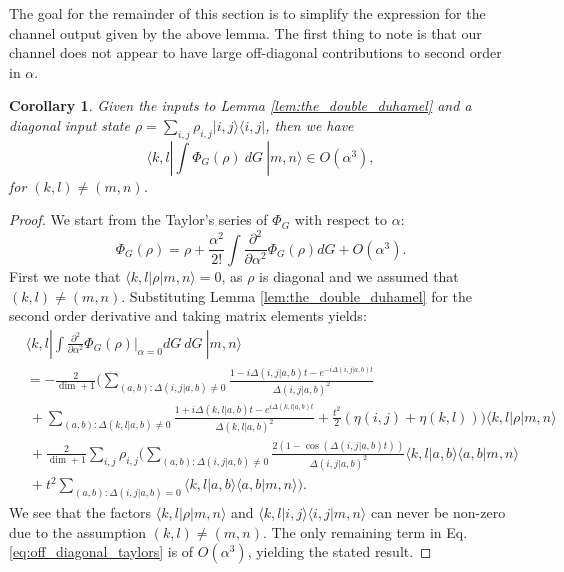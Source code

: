 \documentclass{article}
\newtheorem{corollary}[theorem]{Corollary}
\newcommand{\ket}[1]{|#1\rangle}
\newcommand{\bra}[1]{\langle #1|}
\newcommand{\braket}[2]{\langle #1|#2\rangle}
\newcommand{\ketbra}[2]{| #1\rangle\! \langle #2|}
\newcommand{\bigo}[1]{O\left( #1 \right)}
\begin{document}
The goal for the remainder of this section is to simplify the expression for the channel output given by the above lemma. The first thing to note is that our channel does not appear to have large off-diagonal contributions to second order in $\alpha$. 
\begin{corollary}
    Given the inputs to Lemma \ref{lem:the_double_duhamel} and a diagonal input state $\rho = \sum_{i,j} \rho_{i,j} \ketbra{i,j}{i,j}$, then we have $$\bra{k,l}  \int \Phi_G(\rho) ~dG~ \ket{m,n} \in \bigo{\alpha^3},$$ for $(k,l) \neq (m,n)$.
\end{corollary}
\begin{proof}
    We start from the Taylor's series of $\Phi_G$ with respect to $\alpha$:
    \begin{equation}
        \Phi_G(\rho) = \rho + \frac{\alpha^2}{2!} \int \frac{\partial^2}{\partial \alpha^2} \Phi_G(\rho) dG + \bigo{\alpha^3}. \label{eq:off_diagonal_taylors}
    \end{equation}
    First we note that $\bra{k,l}\rho \ket{m,n} =0$, as $\rho$ is diagonal and we assumed that $(k,l) \neq (m,n)$. Substituting Lemma \ref{lem:the_double_duhamel} for the second order derivative and taking matrix elements yields:
    \begin{align}
        &\bra{k,l} \int \frac{\partial^2}{\partial \alpha^2} \Phi_G(\rho)\bigg|_{\alpha = 0} dG ~dG ~\ket{m,n}  \\
     &= -\frac{2 }{\dim + 1} \bigg(\sum_{(a,b): \Delta(i,j|a,b) \neq 0} \frac{1 - i \Delta(i,j|a,b)t - e^{-i \Delta(i,j|a,b) t}}{\Delta(i,j|a,b)^2} \nonumber \\
     &~+ \sum_{(a,b): \Delta(k,l|a,b) \neq 0} \frac{1 + i \Delta(k,l|a,b) t - e^{i \Delta(k,l|a,b) t}}{\Delta(k,l|a,b)^2} + \frac{t^2}{2}(\eta(i,j) + \eta(k,l)) \bigg) \bra{k,l} \rho \ket{m,n} \nonumber \\
    &~ + \frac{2}{\dim+1}\sum_{i,j} \rho_{i,j} \bigg(\sum_{(a,b): \Delta(i,j|a,b) \neq 0 } \frac{2(1- \cos (\Delta(i,j|a,b)t))}{\Delta(i,j|a,b)^2} \braket{k,l}{a,b} \braket{a,b}{m,n} \nonumber \\
    &~ + t^2 \sum_{(a,b) : \Delta(i,j|a,b) = 0} \braket{k,l}{a,b} \braket{a,b}{m,n} \bigg).
    \end{align}
    We see that the factors $\bra{k,l}\rho \ket{m,n}$ and $\braket{k,l}{i,j} \braket{i,j}{m,n}$ can never be non-zero due to the assumption $(k,l) \neq (m,n)$. The only remaining term in Eq. \ref{eq:off_diagonal_taylors} is of $\bigo{\alpha^3}$, yielding the stated result.
\end{proof}
\end{document}
